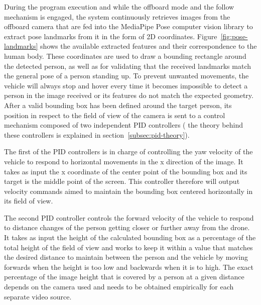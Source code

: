 During the program execution and while the offboard mode and the follow mechanism is engaged, the system continuously retrieves images from the offboard camera that are fed into the MediaPipe Pose computer vision library to extract pose landmarks from it in the form of 2D coordinates.
Figure~\ref{fig:pose-landmarks} shows the available extracted features and their correspondence to the human body.
These coordinates are used to draw a bounding rectangle around the detected person, as well as for validating that the received landmarks match the general pose of a person standing up.
To prevent unwanted movements, the vehicle will always stop and hover every time it becomes impossible to detect a person in the image received or its features do not match the expected geometry.
After a valid bounding box has been defined around the target person, its position in respect to the field of view of the camera is sent to a control mechanism composed of two independent PID controllers ( the theory behind these controllers is explained in section~\ref{subsec:pid-theory}).

The first of the PID controllers is in charge of controlling the yaw velocity of the vehicle to respond to horizontal movements in the x direction of the image. 
It takes as input the x coordinate of the center point of the bounding box and its target is the middle point of the screen.
This controller therefore will output velocity commands aimed to maintain the bounding box centered horizontally in its field of view.

The second PID controller controls the forward velocity of the vehicle to respond to distance changes of the person getting closer or further away from the drone.
It takes as input the height of the calculated bounding box as a percentage of the total height of the field of view and works to keep it within a value that matches the desired distance to maintain between the person and the vehicle by moving forwards when the height is too low and backwards when it is to high.
The exact percentage of the image height that is covered by a person at a given distance depends on the camera used and needs to be obtained empirically for each separate video source.

